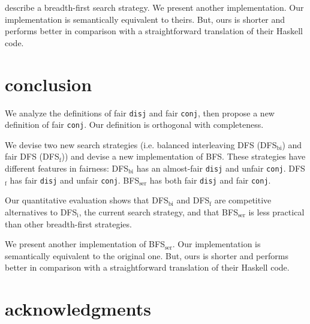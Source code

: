 \documentclass[format=acmlarge, review=true, authordraft=true]{acmart}
\newcommand{\conj}{\texttt{conj}}
\newcommand{\disj}{\texttt{disj}}
\newcommand{\DFSi }[0]{DFS$_\textrm{i}$}
\newcommand{\DFSf }[0]{DFS$_\textrm{f}$}
\newcommand{\DFSbi}[0]{DFS$_\textrm{bi}$}
\newcommand{\BFSser}[0]{BFS$_\textrm{ser}$}
\begin{document}
\citet{seres1999algebra} describe a breadth-first search 
strategy. We present another implementation. Our implementation is semantically 
equivalent to theirs. But, ours is shorter and performs better in comparison 
with a straightforward translation of their Haskell code.


\section{conclusion}

We analyze the definitions of fair \disj{} and fair \conj{}, then propose a 
new definition of fair \conj{}. Our definition is orthogonal with completeness.

We devise two new search strategies (i.e. balanced interleaving DFS 
(\DFSbi{}) and fair DFS (\DFSf{})) and devise a new 
implementation of BFS. These strategies have different features 
in fairness: \DFSbi{} has an almost-fair \disj{} and unfair \conj{}. 
\DFSf{} has fair \disj{} and unfair \conj{}. \BFSser{} has both fair
\disj{} and fair \conj{}.

Our quantitative evaluation shows that \DFSbi{} and \DFSf{} are 
competitive 
alternatives to \DFSi{}, the current search strategy, and that 
\BFSser{} is less practical than other breadth-first strategies.

We present another implementation of \BFSser. Our implementation is 
semantically equivalent to the original one. But, ours is shorter and performs 
better in comparison with a straightforward translation of their Haskell code.




\section*{acknowledgments}



\end{document}
